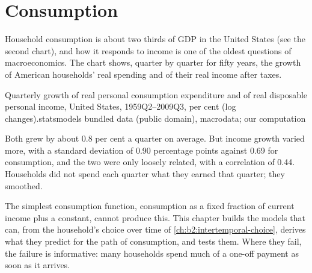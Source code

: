 \chapter{Consumption}\label{ch:b2:consumption}

Household consumption is about two thirds of GDP in the United States (see the second chart), and how it responds to income is one of the oldest
questions of macroeconomics. The chart shows, quarter by quarter for fifty years, the growth of American households'
real spending and of their real income after taxes.

\begin{openingchart}{Quarterly growth of real personal consumption expenditure and of real disposable personal income,
  United States, 1959Q2--2009Q3, per cent (log changes).}{statsmodels bundled data (public domain), macrodata; our
  computation}
\end{openingchart}

Both grew by about 0.8 per cent a quarter on average. But income growth varied more, with a standard deviation of 0.90
percentage points against 0.69 for consumption, and the two were only loosely related, with a correlation of 0.44.
Households did not spend each quarter what they earned that quarter; they smoothed.

The simplest consumption function, consumption as a fixed fraction of current income plus a constant, cannot produce
this. This chapter builds the models that can, from the household's choice over time of \cref{ch:b2:intertemporal-choice},
derives what they predict for the path of consumption, and tests them. Where they fail, the failure is informative: many
households spend much of a one-off payment as soon as it arrives.

